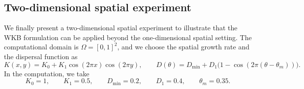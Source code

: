 \documentclass[11pt]{article}
\begin{document}




%




\subsection{Two-dimensional spatial experiment}\label{subsec:test_2d_new}

We finally present a two-dimensional spatial experiment to illustrate that the
WKB formulation can be applied beyond the one-dimensional spatial setting.  The
computational domain is $\Omega=[0,1]^2$, and we choose the spatial growth
rate and the dispersal function as
$$
K(x,y)=K_0+K_1\cos(2\pi x)\cos(2\pi y),
\qquad
D(\theta)=D_{\min}+D_1\bigl(1-\cos(2\pi(\theta-\theta_m))\bigr).
$$
In the computation, we take
$$
K_0=1,\qquad K_1=0.5,\qquad D_{\min}=0.2,\qquad D_1=0.4,
\qquad \theta_m=0.35 .
$$
\end{document}
